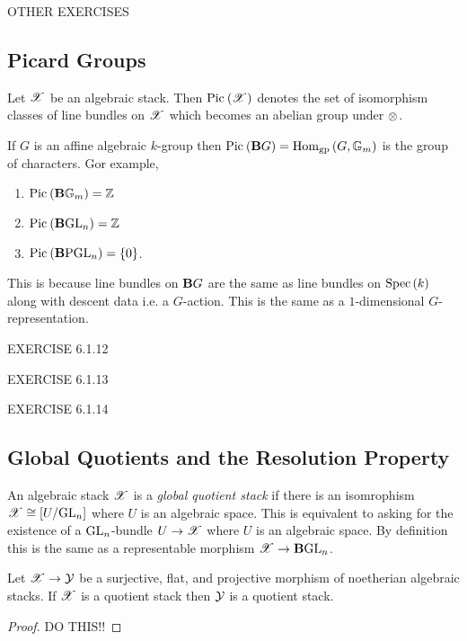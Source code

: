 \documentclass[12pt]{article}
\begin{document}
{\color{red} OTHER EXERCISES}


\subsection{Picard Groups}

Let $\mathscr{X}$ be an algebraic stack. Then $\mathrm{Pic}^{} \left( \mathscr{X} \right)$ denotes the set of isomorphism classes of line bundles on $\mathscr{X}$ which becomes an abelian group under $\otimes$.

\begin{example}
If $G$ is an affine algebraic $k$-group then $\mathrm{Pic}^{} \left( \mathbf{B} G \right) = \mathrm{Hom}_{\text{gp}} \left( G, {\mathbb{G}_m} \right)$ is the group of characters. Gor example, 
\begin{enumerate}
\item $\mathrm{Pic}^{} \left( \mathbf{B} {\mathbb{G}_m} \right) = \mathbb{Z}$
\item $\mathrm{Pic}^{} \left( \mathbf{B} \mathrm{GL}_n \right) = \mathbb{Z}$
\item $\mathrm{Pic}^{} \left( \mathbf{B} \mathrm{PGL}_n \right) = \{ 0 \}$.
\end{enumerate}
This is because line bundles on $\mathbf{B} G$ are the same as line bundles on $\mathrm{Spec}\left( k \right)$ along with descent data i.e. a $G$-action. This is the same as a $1$-dimensional $G$-representation. 
\end{example}

{\color{red} EXERCISE 6.1.12

EXERCISE 6.1.13

EXERCISE 6.1.14 }

\subsection{Global Quotients and the Resolution Property}

\begin{defn}
An algebraic stack $\mathscr{X}$ is a \textit{global quotient stack} if there is an isomrophism $\mathscr{X} \cong [U / \mathrm{GL}_n]$ where $U$ is an algebraic space. This is equivalent to asking for the existence of a $\mathrm{GL}_n$-bundle $U \to \mathscr{X}$ where $U$ is an algebraic space. By definition this is the same as a representable morphism $\mathscr{X} \to \mathbf{B} \mathrm{GL}_n$.
\end{defn}

\begin{prop}
Let $\mathscr{X} \to \mathcal{Y}$ be a surjective, flat, and projective morphism of noetherian algebraic stacks. If $\mathscr{X}$ is a quotient stack then $\mathcal{Y}$ is a quotient stack.
\end{prop}

\begin{proof}
{\color{red} DO THIS!!}
\end{proof}
\end{document}
